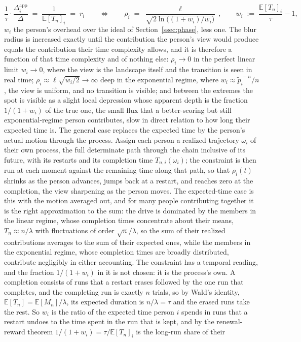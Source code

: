 \documentclass{article}
\begin{document}
\begin{equation}\label{eq:blur}
  \frac{1}{\tau}\cdot\frac{\Delta^{\mathrm{app}}_i}{\Delta} \;=\; \frac{1}{\mathbb{E}[T_n]_i} \;=\; r_i
  \qquad\Longleftrightarrow\qquad
  \rho_i \;=\; \frac{\ell}{\sqrt{2\ln\bigl((1+w_i)/w_i\bigr)}}\,, \qquad w_i \;:=\; \frac{\mathbb{E}[T_n]_i}{\tau} - 1,
\end{equation}
$w_i$ the person's overhead over the ideal of Section~\ref{ssec:phase}, less one. The blur radius is increased exactly until the contribution the person's view would produce equals the contribution their time complexity allows, and it is therefore a function of that time complexity and of nothing else: $\rho_i \to 0$ in the perfect linear limit $w_i \to 0$, where the view is the landscape itself and the transition is seen in real time; $\rho_i \approx \ell\sqrt{w_i/2} \to \infty$ deep in the exponential regime, where $w_i \approx \widetilde{p}_i^{\,-n}/n$, the view is uniform, and no transition is visible; and between the extremes the spot is visible as a slight local depression whose apparent depth is the fraction $1/(1+w_i)$ of the true one, the small flux that a better-scoring but still exponential-regime person contributes, slow in direct relation to how long their expected time is. The general case replaces the expected time by the person's actual motion through the process. Assign each person a realized trajectory $\omega_i$ of their own process, the full determinate path through the chain inclusive of its future, with its restarts and its completion time $T_{n,i}(\omega_i)$; the constraint is then run at each moment against the remaining time along that path, so that $\rho_i(t)$ shrinks as the person advances, jumps back at a restart, and reaches zero at the completion, the view sharpening as the person moves. The expected-time case is this with the motion averaged out, and for many people contributing together it is the right approximation to the sum: the drive is dominated by the members in the linear regime, whose completion times concentrate about their means, $T_n \approx n/\lambda$ with fluctuations of order $\sqrt{n}/\lambda$, so the sum of their realized contributions averages to the sum of their expected ones, while the members in the exponential regime, whose completion times are broadly distributed, contribute negligibly in either accounting. The constraint has a temporal reading, and the fraction $1/(1+w_i)$ in it is not chosen: it is the process's own. A completion consists of runs that a restart erases followed by the one run that completes, and the completing run is exactly $n$ trials, so by Wald's identity, $\mathbb{E}[T_n] = \mathbb{E}[M_n]/\lambda$, its expected duration is $n/\lambda = \tau$ and the erased runs take the rest. So $w_i$ is the ratio of the expected time person $i$ spends in runs that a restart undoes to the time spent in the run that is kept, and by the renewal-reward theorem $1/(1+w_i) = \tau/\mathbb{E}[T_n]_i$ is the long-run share of their 
\end{document}
